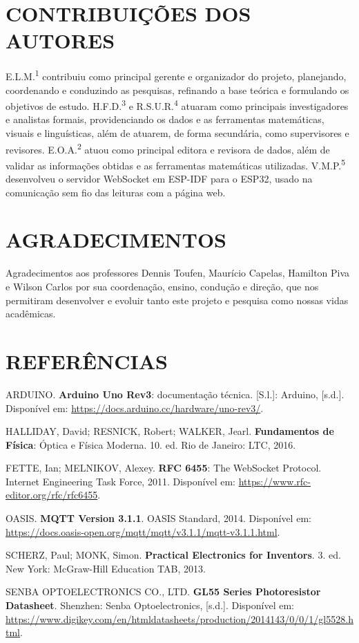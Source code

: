 \documentclass[11pt,a4paper]{article}
\begin{document}
\section*{CONTRIBUIÇÕES DOS AUTORES}

E.L.M.\textsuperscript{1} contribuiu como principal gerente e organizador do projeto, planejando, coordenando e conduzindo as pesquisas, refinando a base teórica e formulando os objetivos de estudo. H.F.D.\textsuperscript{3} e R.S.U.R.\textsuperscript{4} atuaram como principais investigadores e analistas formais, providenciando os dados e as ferramentas matemáticas, visuais e linguísticas, além de atuarem, de forma secundária, como supervisores e revisores. E.O.A.\textsuperscript{2} atuou como principal editora e revisora de dados, além de validar as informações obtidas e as ferramentas matemáticas utilizadas. V.M.P.\textsuperscript{5} desenvolveu o servidor WebSocket em ESP-IDF para o ESP32, usado na comunicação sem fio das leituras com a página web.

\section*{AGRADECIMENTOS}

Agradecimentos aos professores Dennis Toufen, Maurício Capelas, Hamilton Piva e Wilson Carlos por sua coordenação, ensino, condução e direção, que nos permitiram desenvolver e evoluir tanto este projeto e pesquisa como nossas vidas acadêmicas.

\section*{REFERÊNCIAS}

\begin{flushleft}
\small
ARDUINO. \textbf{Arduino Uno Rev3}: documentação técnica. [S.l.]: Arduino, [s.d.]. Disponível em: \url{https://docs.arduino.cc/hardware/uno-rev3/}.

\vspace{6pt}
HALLIDAY, David; RESNICK, Robert; WALKER, Jearl. \textbf{Fundamentos de Física}: Óptica e Física Moderna. 10. ed. Rio de Janeiro: LTC, 2016.

\vspace{6pt}
FETTE, Ian; MELNIKOV, Alexey. \textbf{RFC 6455}: The WebSocket Protocol. Internet Engineering Task Force, 2011. Disponível em: \url{https://www.rfc-editor.org/rfc/rfc6455}.

\vspace{6pt}
OASIS. \textbf{MQTT Version 3.1.1}. OASIS Standard, 2014. Disponível em: \url{https://docs.oasis-open.org/mqtt/mqtt/v3.1.1/mqtt-v3.1.1.html}.

\vspace{6pt}
SCHERZ, Paul; MONK, Simon. \textbf{Practical Electronics for Inventors}. 3. ed. New York: McGraw-Hill Education TAB, 2013.

\vspace{6pt}
SENBA OPTOELECTRONICS CO., LTD. \textbf{GL55 Series Photoresistor Datasheet}. Shenzhen: Senba Optoelectronics, [s.d.]. Disponível em: \url{https://www.digikey.com/en/htmldatasheets/production/2014143/0/0/1/gl5528.html}.
\end{flushleft}
\end{document}
